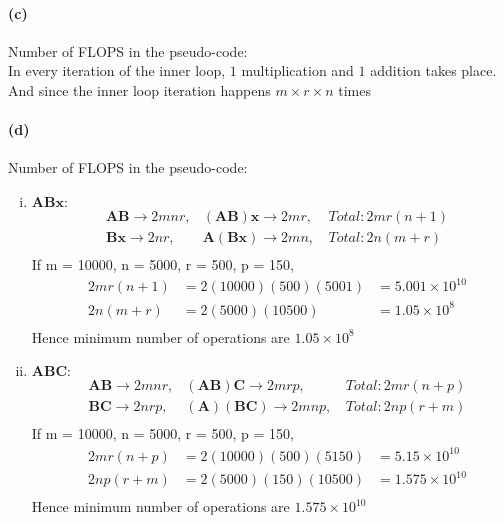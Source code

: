 \documentclass{article}
\begin{document}
\paragraph{(c)} Number of FLOPS in the pseudo-code:\\
In every iteration of the inner loop, $1$ multiplication and $1$ addition takes place. And since the inner loop iteration happens $m \times r \times n$ times\\

\paragraph{(d)} Number of FLOPS in the pseudo-code:\\
\begin{enumerate}[(i)]
\item $\mathbf{ABx}:$
\begin{align*}
&\mathbf{AB} \rightarrow 2mnr, &(\mathbf{AB})\mathbf{x} \rightarrow 2mr,\, &Total: 2mr(n+1)\\
&\mathbf{Bx} \rightarrow 2nr, &\mathbf{A}(\mathbf{Bx}) \rightarrow 2mn,\, &Total: 2n(m+r)\\
\end{align*}
If m = 10000, n = 5000, r = 500, p = 150,
\begin{align*}
&2mr(n+1) &= 2(10000)(500)(5001) &= 5.001 \times 10^{10}\\
&2n(m+r) &= 2(5000)(10500) &= 1.05 \times 10^{8}\\
\end{align*}
Hence minimum number of operations are $1.05 \times 10^{8}$

\item $\mathbf{ABC}:$
\begin{align*}
&\mathbf{AB} \rightarrow 2mnr, &(\mathbf{AB})\mathbf{C} \rightarrow 2mrp,\, &Total: 2mr(n+p)\\
&\mathbf{BC} \rightarrow 2nrp, &(\mathbf{A})(\mathbf{BC}) \rightarrow 2mnp,\, &Total: 2np(r+m)\\
\end{align*}
If m = 10000, n = 5000, r = 500, p = 150,
\begin{align*}
&2mr(n+p) &= 2(10000)(500)(5150) &= 5.15 \times 10^{10}\\
&2np(r+m) &= 2(5000)(150)(10500) &= 1.575 \times 10^{10}\\
\end{align*}
Hence minimum number of operations are $1.575 \times 10^{10}$
\end{enumerate}
\end{document}
